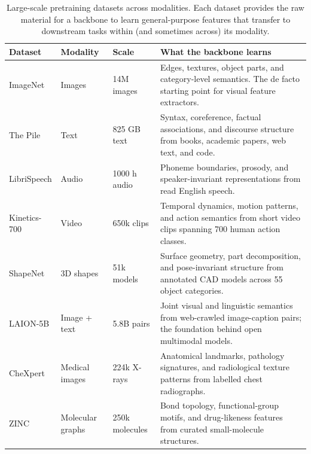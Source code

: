 \begin{table}[ht]
\centering
\begin{tabular}{p{}p{}p{}p{}}
    \toprule
    \textbf{Dataset} & \textbf{Modality} & \textbf{Scale} & \textbf{What the backbone learns} \\
    \midrule
    ImageNet \citealt{Deng2009ImageNet} & Images & 14M images & Edges, textures, object parts, and category-level semantics. The de facto starting point for visual feature extractors. \\
    The Pile \citealt{Gao2020Pile} & Text & 825 GB text & Syntax, coreference, factual associations, and discourse structure from books, academic papers, web text, and code. \\
    LibriSpeech \citealt{Panayotov2015LibriSpeech} & Audio & 1000 h audio & Phoneme boundaries, prosody, and speaker-invariant representations from read English speech. \\
    Kinetics-700 \citealt{Carreira2022Kinetics700} & Video & 650k clips & Temporal dynamics, motion patterns, and action semantics from short video clips spanning 700 human action classes. \\
    ShapeNet \citealt{Chang2015ShapeNet} & 3D shapes & 51k models & Surface geometry, part decomposition, and pose-invariant structure from annotated CAD models across 55 object categories. \\
    LAION-5B \citealt{Schuhmann2022LAION5B} & Image + text & 5.8B pairs & Joint visual and linguistic semantics from web-crawled image-caption pairs; the foundation behind open multimodal models. \\
    CheXpert \citealt{Irvin2019CheXpert} & Medical images & 224k X-rays & Anatomical landmarks, pathology signatures, and radiological texture patterns from labelled chest radiographs. \\
    ZINC \citealt{Sterling2015ZINC} & Molecular graphs & 250k molecules & Bond topology, functional-group motifs, and drug-likeness features from curated small-molecule structures. \\
    \bottomrule
\end{tabular}
\vspace{2em}
\caption{Large-scale pretraining datasets across modalities. Each dataset provides the raw material for a backbone to learn general-purpose features that transfer to downstream tasks within (and sometimes across) its modality.}
\label{tab:pretraining_datasets}
\end{table}

